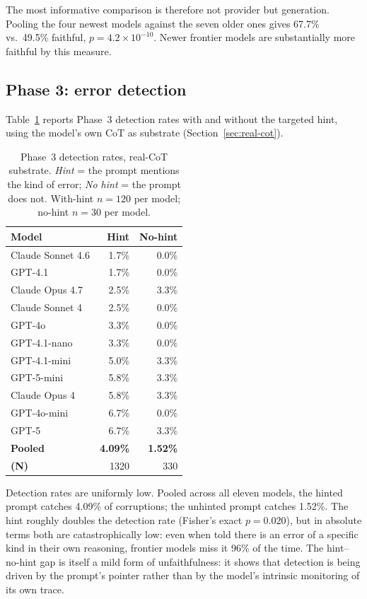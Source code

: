 \documentclass[11pt]{article}
\begin{document}
The most informative comparison is therefore not provider but generation. Pooling the four newest models against the seven older ones gives 67.7\% vs.\ 49.5\% faithful, $p=4.2\!\times\!10^{-10}$. Newer frontier models are substantially more faithful by this measure.

\subsection{Phase 3: error detection}

Table~\ref{tab:phase3} reports Phase~3 detection rates with and without the targeted hint, using the model's own CoT as substrate (Section~\ref{sec:real-cot}).

\begin{table}[t]
\centering
\small
\caption{Phase~3 detection rates, real-CoT substrate. \textit{Hint} = the prompt mentions the kind of error; \textit{No hint} = the prompt does not. With-hint $n=120$ per model; no-hint $n=30$ per model.}
\label{tab:phase3}
\begin{tabular}{lrr}
\toprule
Model & Hint & No-hint \\
\midrule
Claude Sonnet 4.6   & 1.7\% &  0.0\% \\
GPT-4.1             & 1.7\% &  0.0\% \\
Claude Opus 4.7     & 2.5\% &  3.3\% \\
Claude Sonnet 4     & 2.5\% &  0.0\% \\
GPT-4o              & 3.3\% &  0.0\% \\
GPT-4.1-nano        & 3.3\% &  0.0\% \\
GPT-4.1-mini        & 5.0\% &  3.3\% \\
GPT-5-mini          & 5.8\% &  3.3\% \\
Claude Opus 4       & 5.8\% &  3.3\% \\
GPT-4o-mini         & 6.7\% &  0.0\% \\
GPT-5               & 6.7\% &  3.3\% \\
\midrule
\textbf{Pooled}     & \textbf{4.09\%} & \textbf{1.52\%} \\
\textbf{(N)}        & 1320  & 330 \\
\bottomrule
\end{tabular}
\end{table}

Detection rates are uniformly low. Pooled across all eleven models, the hinted prompt catches 4.09\% of corruptions; the unhinted prompt catches 1.52\%. The hint roughly doubles the detection rate (Fisher's exact $p=0.020$), but in absolute terms both are catastrophically low: even when told there is an error of a specific kind in their own reasoning, frontier models miss it 96\% of the time. The hint--no-hint gap is itself a mild form of unfaithfulness: it shows that detection is being driven by the prompt's pointer rather than by the model's intrinsic monitoring of its own trace.
\end{document}
